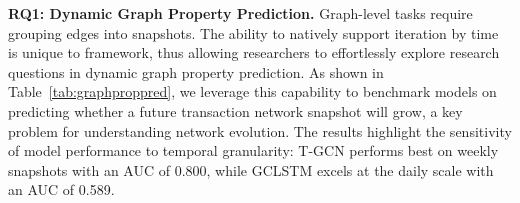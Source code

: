 \begin{minipage}[t]{0.51\textwidth}
\textbf{RQ1: Dynamic Graph Property Prediction.} 
Graph-level tasks require grouping edges into snapshots. The ability to natively support iteration by time is unique to \name framework, thus allowing researchers to effortlessly explore research questions in dynamic graph property prediction. As shown in Table~\ref{tab:graphproppred}, we leverage this capability to benchmark models on predicting whether a future transaction network snapshot will grow, a key problem for understanding network evolution. The results highlight the sensitivity of model performance to temporal granularity: T-GCN performs best on weekly snapshots with an AUC of 0.800, while GCLSTM excels at the daily scale with an AUC of 0.589.
\end{minipage}
\hfill
\begin{minipage}[t]{0.45\textwidth}
\centering
{}
\label{tab:graphproppred}
\end{minipage}


